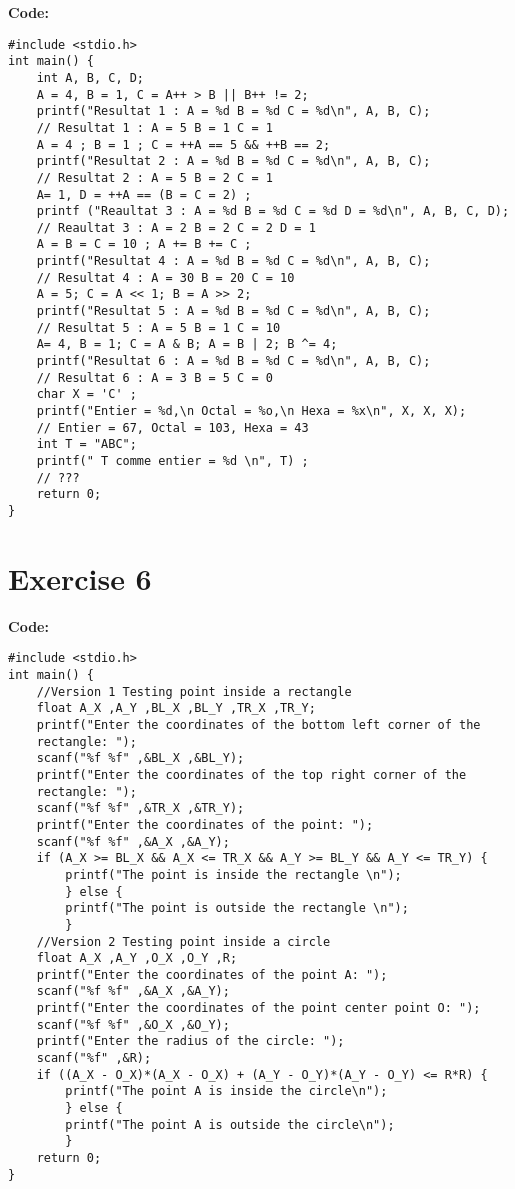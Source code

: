 \documentclass[12pt]{article}
\begin{document}
\textbf{Code:}
\begin{lstlisting}
#include <stdio.h>
int main() {
	int A, B, C, D;
	A = 4, B = 1, C = A++ > B || B++ != 2;
	printf("Resultat 1 : A = %d B = %d C = %d\n", A, B, C);
	// Resultat 1 : A = 5 B = 1 C = 1
	A = 4 ; B = 1 ; C = ++A == 5 && ++B == 2;
	printf("Resultat 2 : A = %d B = %d C = %d\n", A, B, C);
	// Resultat 2 : A = 5 B = 2 C = 1
	A= 1, D = ++A == (B = C = 2) ;
	printf ("Reaultat 3 : A = %d B = %d C = %d D = %d\n", A, B, C, D);
	// Reaultat 3 : A = 2 B = 2 C = 2 D = 1
	A = B = C = 10 ; A += B += C ;
	printf("Resultat 4 : A = %d B = %d C = %d\n", A, B, C);
	// Resultat 4 : A = 30 B = 20 C = 10
	A = 5; C = A << 1; B = A >> 2;
	printf("Resultat 5 : A = %d B = %d C = %d\n", A, B, C);
	// Resultat 5 : A = 5 B = 1 C = 10
	A= 4, B = 1; C = A & B; A = B | 2; B ^= 4;
	printf("Resultat 6 : A = %d B = %d C = %d\n", A, B, C);
	// Resultat 6 : A = 3 B = 5 C = 0
	char X = 'C' ;
	printf("Entier = %d,\n Octal = %o,\n Hexa = %x\n", X, X, X);
	// Entier = 67, Octal = 103, Hexa = 43
	int T = "ABC";
	printf(" T comme entier = %d \n", T) ;
	// ???
	return 0;
}
\end{lstlisting}
\vspace{1cm}
\section*{Exercise 6}
\vspace{0.5cm}

\textbf{Code:} 
\begin{lstlisting}
#include <stdio.h>
int main() {
	//Version 1 Testing point inside a rectangle
	float A_X ,A_Y ,BL_X ,BL_Y ,TR_X ,TR_Y;
	printf("Enter the coordinates of the bottom left corner of the
	rectangle: ");
	scanf("%f %f" ,&BL_X ,&BL_Y);
	printf("Enter the coordinates of the top right corner of the
	rectangle: ");
	scanf("%f %f" ,&TR_X ,&TR_Y);
	printf("Enter the coordinates of the point: ");
	scanf("%f %f" ,&A_X ,&A_Y);
	if (A_X >= BL_X && A_X <= TR_X && A_Y >= BL_Y && A_Y <= TR_Y) {
		printf("The point is inside the rectangle \n");
		} else {
		printf("The point is outside the rectangle \n");
		}
	//Version 2 Testing point inside a circle
	float A_X ,A_Y ,O_X ,O_Y ,R;
	printf("Enter the coordinates of the point A: ");
	scanf("%f %f" ,&A_X ,&A_Y);
	printf("Enter the coordinates of the point center point O: ");
	scanf("%f %f" ,&O_X ,&O_Y);
	printf("Enter the radius of the circle: ");
	scanf("%f" ,&R);
	if ((A_X - O_X)*(A_X - O_X) + (A_Y - O_Y)*(A_Y - O_Y) <= R*R) {
		printf("The point A is inside the circle\n");
		} else {
		printf("The point A is outside the circle\n");
		}
	return 0;
}
\end{lstlisting}
\vspace{1cm}
\newpage
\end{document}
